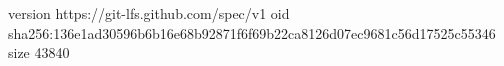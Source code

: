 version https://git-lfs.github.com/spec/v1
oid sha256:136e1ad30596b6b16e68b92871f6f69b22ca8126d07ec9681c56d17525c55346
size 43840
